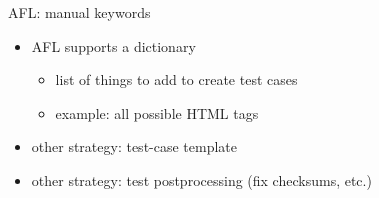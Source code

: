 
\begin{frame}{AFL: manual keywords}
    \begin{itemize}
    \item AFL supports a dictionary
        \begin{itemize}
        \item list of things to add to create test cases
        \item example: all possible HTML tags
        \end{itemize}
        \vspace{.5cm}
    \item other strategy: test-case template
    \item other strategy: test postprocessing (fix checksums, etc.)
    \end{itemize}
\end{frame}

